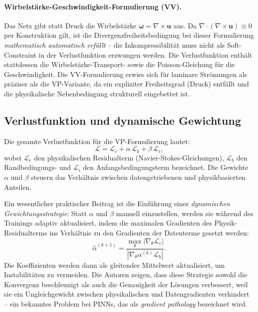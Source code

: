 \documentclass[a4paper,12pt]{article}
\begin{document}
\paragraph{Wirbelstärke-Geschwindigkeit-Formulierung (VV).}
Das Netz gibt statt Druck die Wirbelstärke $\boldsymbol{\omega} = \nabla
\times \mathbf{u}$ aus. Da $\nabla \cdot (\nabla \times \mathbf{u}) \equiv
0$ per Konstruktion gilt, ist die Divergenzfreiheitsbedingung bei dieser
Formulierung \emph{mathematisch automatisch erfüllt} -- die
Inkompressibilität muss nicht als Soft-Constraint in der Verlustfunktion
erzwungen werden. Die Verlustfunktion enthält stattdessen die
Wirbelstärke-Transport- sowie die Poisson-Gleichung für die Geschwindigkeit.
Die VV-Formulierung erwies sich für laminare Strömungen als präziser als
die VP-Variante, da ein expliziter Freiheitsgrad (Druck) entfällt und die
physikalische Nebenbedingung strukturell eingebettet ist.

\subsection*{Verlustfunktion und dynamische Gewichtung}

Die gesamte Verlustfunktion für die VP-Formulierung lautet:
\begin{equation}
    \mathcal{L} = \mathcal{L}_e + \alpha\,\mathcal{L}_b + \beta\,\mathcal{L}_i,
\end{equation}
wobei $\mathcal{L}_e$ den physikalischen Residualterm (Navier-Stokes-Gleichungen),
$\mathcal{L}_b$ den Randbedingungs- und $\mathcal{L}_i$ den
Anfangsbedingungsterm bezeichnet. Die Gewichte $\alpha$ und $\beta$ steuern das
Verhältnis zwischen datengetriebenen und physikbasierten Anteilen.

Ein wesentlicher praktischer Beitrag ist die Einführung einer \emph{dynamischen
Gewichtungsstrategie}: Statt $\alpha$ und $\beta$ manuell einzustellen, werden
sie während des Trainings adaptiv aktualisiert, indem die maximalen
Gradienten des Physik-Residualterms ins Verhältnis zu den Gradienten der
Datenterme gesetzt werden:
\begin{equation}
    \hat{\alpha}^{(k+1)} = \frac{\max_\theta|\nabla_\theta \mathcal{L}_e|}
    {|\nabla_\theta \alpha^{(k)} \mathcal{L}_b|}.
\end{equation}
Die Koeffizienten werden dann als gleitender Mittelwert aktualisiert, um
Instabilitäten zu vermeiden. Die Autoren zeigen, dass diese Strategie sowohl
die Konvergenz beschleunigt als auch die Genauigkeit der Lösungen verbessert,
weil sie ein Ungleichgewicht zwischen physikalischen und Datengradienten
verhindert -- ein bekanntes Problem bei PINNs, das als \emph{gradient
pathology} bezeichnet wird.
\end{document}
